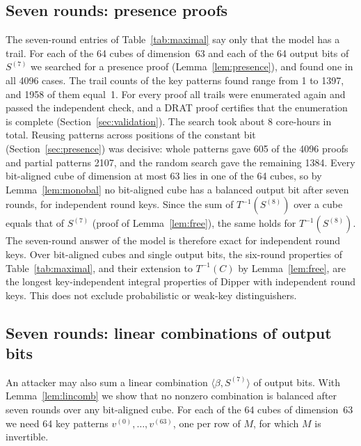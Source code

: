 \documentclass[11pt,a4paper]{article}
\theoremstyle{definition}
\theoremstyle{remark}
\begin{document}
\subsection{Seven rounds: presence proofs}\label{sec:r7presence}
The seven-round entries of Table~\ref{tab:maximal} say only that the model has a trail. For each of the 64 cubes of dimension~63 and each of the 64 output bits of $S^{(7)}$ we searched for a presence proof (Lemma~\ref{lem:presence}), and found one in all 4096 cases. The trail counts of the key patterns found range from 1 to 1397, and 1958 of them equal~1. For every proof all trails were enumerated again and passed the independent check, and a DRAT proof certifies that the enumeration is complete (Section~\ref{sec:validation}). The search took about 8 core-hours in total. Reusing patterns across positions of the constant bit (Section~\ref{sec:presence}) was decisive: whole patterns gave 605 of the 4096 proofs and partial patterns 2107, and the random search gave the remaining 1384. Every bit-aligned cube of dimension at most 63 lies in one of the 64 cubes, so by Lemma~\ref{lem:monobal} no bit-aligned cube has a balanced output bit after seven rounds, for independent round keys. Since the sum of $T^{-1}(S^{(8)})$ over a cube equals that of $S^{(7)}$ (proof of Lemma~\ref{lem:free}), the same holds for $T^{-1}(S^{(8)})$. The seven-round answer of the model is therefore exact for independent round keys. Over bit-aligned cubes and single output bits, the six-round properties of Table~\ref{tab:maximal}, and their extension to $T^{-1}(C)$ by Lemma~\ref{lem:free}, are the longest key-independent integral properties of Dipper with independent round keys. This does not exclude probabilistic or weak-key distinguishers.

\subsection{Seven rounds: linear combinations of output bits}\label{sec:r7lin}
An attacker may also sum a linear combination $\langle\beta,S^{(7)}\rangle$ of output bits. With Lemma~\ref{lem:lincomb} we show that no nonzero combination is balanced after seven rounds over any bit-aligned cube. For each of the 64 cubes of dimension~63 we need 64 key patterns $v^{(0)},\dots,v^{(63)}$, one per row of $M$, for which $M$ is invertible.
\end{document}
